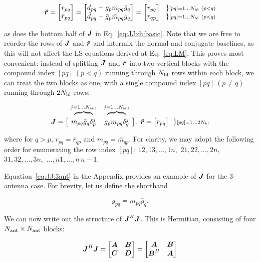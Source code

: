 \documentclass[useAMS,usenatbib]{mn2e}
\makeatletter
\newcommand{\mat}[1]{{\bmath{#1}}}
\newcommand{\JJ}{\mat{J}} %
\newcommand{\Matrix}[2]{\left [ \begin{array}{@{}#1@{}}#2\end{array} \right ]}
\newcommand{\Stack}[1]{\begin{array}{@{}c@{}}#1\end{array}}
\newcommand{\AUG}[1]{\bmath{\breve{#1}}}
\newcommand{\Rr}{\AUG{r}}
\makeatother
\begin{document}
\[
\Rr = \Matrix{c}{ r_{pq} \\ \bar{r}_{pq} } = \Matrix{c}{d_{pq}-g_p m_{pq}\bar{g}_q\\ \bar{d}_{pq}-\bar{g}_p \bar{m}_{pq}g_q} = 
\Matrix{c}{ r_{pq} \\ r_{qp} }~~ 
\Stack{ \} \scriptstyle [pq]=1\dots \Nbl~(p<q) \\ \} \scriptstyle [pq]=1\dots \Nbl~(p<q) }
\]

as does the bottom half of $\JJ$ in Eq.~\ref{eq:JJ:di:basic}. Note that we are free to reorder the rows of $\JJ$ and $\Rr$ 
and intermix the normal and conjugate baselines, as this will not affect the LS equations derived at Eq.~\ref{eq:LM}.
This proves most convenient: instead of splitting $\JJ$ and $\Rr$ into 
two vertical blocks with the compound index $[pq]~(p<q)$ running through $N_\mathrm{bl}$ rows within each block, we can treat 
the two blocks as one, with a single compound index $[pq]~(p\ne q)$ running through $2N_\mathrm{bl}$ rows:

\begin{equation}
\label{eq:JJ:di}
\begin{array}{r@{~}cc@{~}cc}
                & \overbrace{~~~~~~~~}^{j=1\dots \Na} & \overbrace{~~~~~~~~}^{j=1\dots \Na} \\
\JJ = \big [ & m_{pq}\bar{g}_q\delta^{j}_p & g_p m_{pq} \delta^{j}_q & \big ],~
\Rr = \big [ r_{pq} \big ] ~~{\} \scriptstyle [pq]=1\dots 2\Nbl}
\end{array}
\end{equation}

where for $q>p$, $r_{pq}=\bar{r}_{qp}$ and $m_{pq}=\bar{m}_{qp}$. For clarity, we may adopt the 
following order for enumerating the row index $[pq]$: $12,13,\dots,1n,$ $21,22,\dots,2n,$ $31,32,\dots,3n,$ $\dots,n1,\dots,n\,n-1$. 

Equation~\ref{eq:JJ:3ant} in the Appendix provides an example of $\JJ$ for the 3-antenna case. For
brevity, let us define the shorthand 

\[
y_{pq} = m_{pq} \bar{g}_q. 
\]

We can now write out the 
structure of $\JJ^H\JJ$. This is Hermitian, consisting of four $N_\mathrm{ant}\times N_\mathrm{ant}$ blocks:

\begin{equation}
\label{eq:JHJ:DI:ABCD}
\JJ^H\JJ = \Matrix{cc}{\mat{A}&\mat{B}\\\mat{C}&\mat{D}} = \Matrix{cc}{\mat{A}&\mat{B}\\\mat{B}^H&\mat{A}}
\end{equation}
\end{document}
